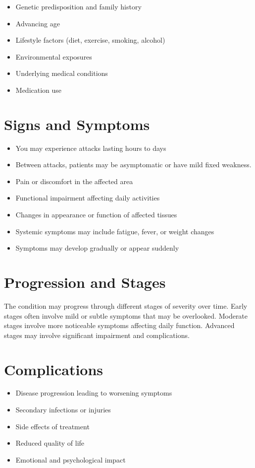 \begin{itemize}[noitemsep]
  \item Genetic predisposition and family history
  \item Advancing age
  \item Lifestyle factors (diet, exercise, smoking, alcohol)
  \item Environmental exposures
  \item Underlying medical conditions
  \item Medication use
\end{itemize}
\section{Signs and Symptoms}
\begin{itemize}[noitemsep]
  \item You may experience attacks lasting hours to days
  \item Between attacks, patients may be asymptomatic or have mild fixed weakness.
  \item Pain or discomfort in the affected area
  \item Functional impairment affecting daily activities
  \item Changes in appearance or function of affected tissues
  \item Systemic symptoms may include fatigue, fever, or weight changes
  \item Symptoms may develop gradually or appear suddenly
\end{itemize}
\section{Progression and Stages}
The condition may progress through different stages of severity over time. Early stages often involve mild or subtle symptoms that may be overlooked. Moderate stages involve more noticeable symptoms affecting daily function. Advanced stages may involve significant impairment and complications.
\section{Complications}
\begin{itemize}[noitemsep]
  \item Disease progression leading to worsening symptoms
  \item Secondary infections or injuries
  \item Side effects of treatment
  \item Reduced quality of life
  \item Emotional and psychological impact
\end{itemize}
